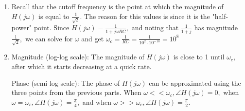 \begin{enumerate}
{\begin{enumerate}[label=(\roman*)]
    Since this filter allows low frequencies to go through and blocks high frequencies, it is called a \emph{low-pass filter}.

  \item Recall that the cutoff frequency is the point at which the magnitude of $H(j \omega)$ is equal to $\frac{1}{\sqrt{2}}.$ 
  The reason for this values is since it is the "half-power" point. Since $H(j \omega) = \frac{1}{1 + j \omega RC},$ and noting that $\frac{1}{1 + j}$ has magnitude $\frac{1}{\sqrt{2}},$ we can solve for $\omega$ and get $\omega_{c} = \frac{1}{RC} = \frac{1}{10^{2} \cdot 10^{-10}} = 10^{8}$

  \item {
  Magnitude (log-log scale): The magnitude of $H(j \omega)$ is close to 1 until $\omega_{c}$, after which it starts decreasing at a quick rate.

  
  Phase (semi-log scale): The phase of $H(j \omega)$ can be approximated using the three points from the previous parts. When $\omega << \omega_{c}, \angle H(j \omega) = 0,$ when $\omega = \omega_{c}, \angle H(j \omega) = \frac{\pi}{4},$ and when $\omega >> \omega_{c}, \angle H(j \omega) = \frac{\pi}{2}.$

  }
\end{enumerate}
}


\end{enumerate}
